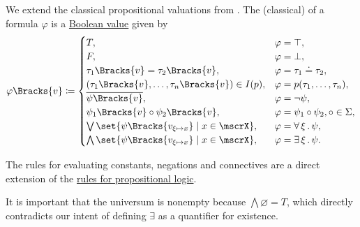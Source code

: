 \begin{definition}
\begin{thmenum}
     We extend the classical propositional valuations from . The (classical)  of a formula \( \varphi \) is a \hyperref[def:boolean_value]{Boolean value} given by
    \begin{equation}\label{eq:def:first_order_valuation/formula_valuation}
      \varphi\Bracks{v} \coloneqq \begin{cases}
        T,                                                                   &\varphi = \top, \\
        F,                                                                   &\varphi = \bot, \\
        \tau_1\Bracks{v} = \tau_2\Bracks{v},                                 &\varphi = \tau_1 \doteq \tau_2, \\
        (\tau_1\Bracks{v}, \ldots, \tau_n\Bracks{v}) \in I(p),               &\varphi = p(\tau_1, \ldots, \tau_n), \\
        \overline{\psi\Bracks{v}},                                           &\varphi = \neg \psi, \\
        \psi_1\Bracks{v} \bincirc \psi_2\Bracks{v},                          &\varphi = \psi_1 \bincirc \psi_2, \bincirc \in \Sigma, \\
        \bigvee\set{ \psi\Bracks{v_{\xi \mapsto x}} \given x \in \mscrX },   &\varphi = \qforall \xi \psi, \\
        \bigwedge\set{ \psi\Bracks{v_{\xi \mapsto x}} \given x \in \mscrX }, &\varphi = \qexists \xi \psi.
      \end{cases}
    \end{equation}

    The rules for evaluating constants, negations and connectives are a direct extension of the \hyperref[def:propositional_valuation/formula_valuation]{rules for propositional logic}.

    It is important that the universum is nonempty because \( \bigwedge\varnothing = T \), which directly contradicts our intent of defining \( \exists \) as a quantifier for existence.
  \end{thmenum}
\end{definition}

